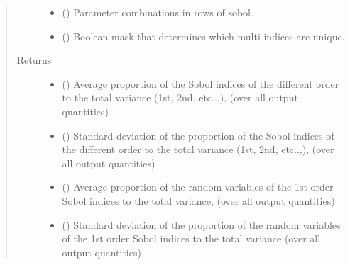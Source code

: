 \documentclass[letterpaper,10pt,english,openany,oneside]{sphinxmanual}
\begin{document}
\begin{fulllineitems}
\begin{fulllineitems}
\begin{quote}
\begin{description}
\begin{itemize}
\item {} 
 (\sphinxstyleliteralemphasis{\sphinxupquote{ {[}}}\sphinxstyleliteralemphasis{\sphinxupquote{{]} }}) \textendash{} Parameter combinations in rows of sobol.

\item {} 
 () \textendash{} Boolean mask that determines which multi indices are unique.

\end{itemize}

\item[{Returns}] \leavevmode
\begin{itemize}
\item {} 
 () \textendash{} Average proportion of the Sobol indices of the different order to the total variance (1st, 2nd, etc..,),
(over all output quantities)

\item {} 
 () \textendash{} Standard deviation of the proportion of the Sobol indices of the different order to the total variance
(1st, 2nd, etc..,), (over all output quantities)

\item {} 
 () \textendash{} Average proportion of the random variables of the 1st order Sobol indices to the total variance,
(over all output quantities)

\item {} 
 () \textendash{} Standard deviation of the proportion of the random variables of the 1st order Sobol indices to the total
variance
(over all output quantities)

\end{itemize}


\end{description}\end{quote}

\end{fulllineitems}


\end{fulllineitems}
\end{document}
